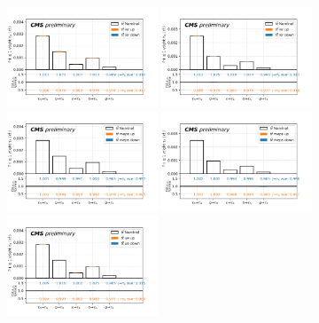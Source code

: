 \begin{figure}
    \centering
    \includegraphics[width=0.4\textwidth]{chapters/Analysis/sectionSystematics/figures/ttTheoretical/2020_MCRatio_isr_tauGenFlavor_tauTight.png}
    \includegraphics[width=0.4\textwidth]{chapters/Analysis/sectionSystematics/figures/ttTheoretical/2020_MCRatio_isr_tauGenFlavor_tauVTight.png}
    \includegraphics[width=0.4\textwidth]{chapters/Analysis/sectionSystematics/figures/ttTheoretical/2020_MCRatio_meps_tauGenFlavor_tauTight.png}
    \includegraphics[width=0.4\textwidth]{chapters/Analysis/sectionSystematics/figures/ttTheoretical/2020_MCRatio_meps_tauGenFlavor_tauVTight.png}
    \includegraphics[width=0.4\textwidth]{chapters/Analysis/sectionSystematics/figures/ttTheoretical/2020_MCRatio_ue_tauGenFlavor_tauTight.png}

\end{figure}
